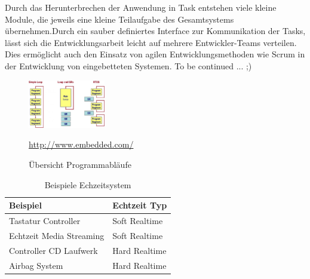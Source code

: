 Durch das Herunterbrechen der Anwendung in Task entstehen viele kleine Module, die jeweils eine kleine Teilaufgabe des Gesamtsystems übernehmen.Durch ein sauber definiertes Interface zur Kommunikation der Tasks, lässt sich die Entwicklungsarbeit leicht auf mehrere Entwickler-Teams verteilen. Dies ermöglicht auch den Einsatz von agilen Entwicklungsmethoden wie Scrum in der Entwicklung von eingebetteten Systemen. 
To be continued ... ;)  
\newline  
\begin{figure}
	\centering
		\includegraphics[width=0.3\textwidth]{Pictures/EmbeddedCom/cwrtos2f5c.jpg}
	\caption{Übersicht Programmabläufe}
	\quelle\url{http://www.embedded.com/}
	\label{fig:Programmablauf}
\end{figure}

\begin{table}
	\begin{tabular}{|l|l|}
		\hline
		\textbf{Beispiel} & \textbf{Echtzeit Typ} \\
		\hline
		Tastatur Controller & Soft Realtime \\
		\hline
		Echtzeit Media Streaming  & Soft Realtime \\
		\hline
		Controller CD Laufwerk  & Hard Realtime \\
		\hline
		Airbag System  & Hard Realtime\\
		\hline
	\end{tabular}
	\caption{Beispiele Echzeitsystem}
	\label{tab:BeispieleEchzeitsystem}
\end{table}




